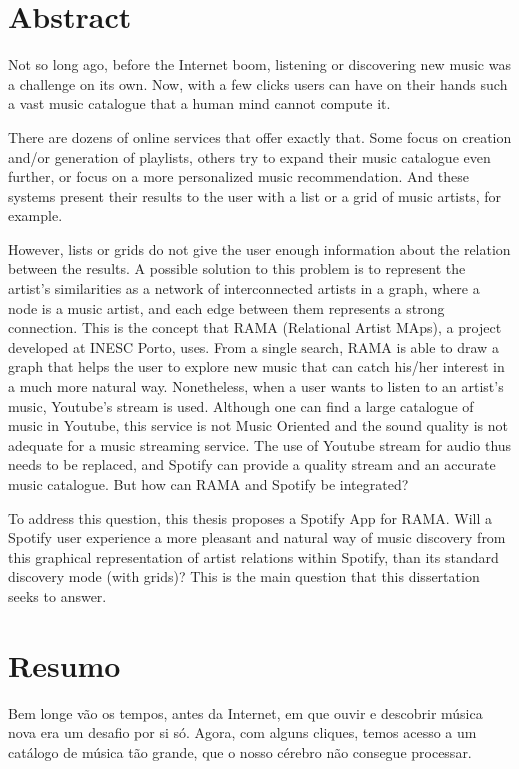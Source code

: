
\chapter*{Abstract}

Not so long ago, before the Internet boom, listening or discovering new music was a challenge on its own.
Now, with a few clicks users can have on their hands such a vast music catalogue that a human mind cannot compute it.

There are dozens of online services that offer  exactly that.
Some focus on creation and/or generation of playlists, others try to expand their music catalogue even further, or focus on a more personalized music recommendation.
And these systems present their results to the user with a list or a grid of music artists, for example.

However, lists or grids do not give the user enough information about the relation between the results. %
A possible solution to this problem is to represent the artist's similarities as a network of interconnected artists in a graph, where a node is a music artist, and each edge between them represents a strong connection.
This is the concept that RAMA (Relational Artist MAps), a project developed at INESC Porto, uses.
From a single search, RAMA is able to draw a graph that helps the user to explore new music that can catch his/her interest in a much more natural way.
Nonetheless, when a user wants to listen to an artist's music, Youtube's stream is used.
Although one can find a large catalogue of music in Youtube, this service is not Music Oriented and the sound quality is not adequate for a music streaming service.
The use of Youtube stream for audio thus needs to be replaced, and Spotify can provide a quality stream and an accurate music catalogue.
But how can RAMA and Spotify be integrated?

To address this question, this thesis proposes a Spotify App for RAMA.
Will a Spotify user experience a more pleasant and natural way of music discovery from this graphical representation of artist relations within Spotify, than its standard discovery mode (with grids)?
This is the main question that this dissertation seeks to answer.

\chapter*{Resumo}

Bem longe vão os tempos, antes da Internet, em que ouvir e descobrir música nova era um desafio por si só.
Agora, com alguns cliques, temos acesso a um catálogo de música tão grande, que o nosso cérebro não consegue processar.

